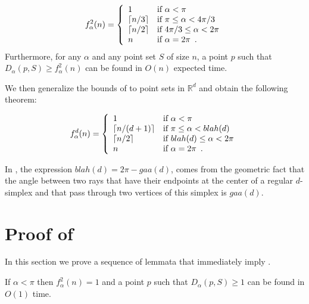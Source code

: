 \documentclass[lotsofwhite]{patmorin}
\begin{document}
\begin{thm}
\[
   f^2_\alpha(n) = \left\{\begin{array}{ll}
                        1 & \mbox{if $\alpha < \pi$} \\
                        \left\lceil n/3 \right\rceil & \mbox{if $\pi\le \alpha < 4\pi/3$} \\
                        \left\lceil n/2 \right\rceil & \mbox{if $4\pi/3\le \alpha < 2\pi$} \\
                        n & \mbox{if $\alpha = 2\pi$\enspace .} 
                       \end{array}\right.
\]
Furthermore, for any $\alpha$ and any point set $S$ of size $n$, a
point $p$ such that $D_\alpha(p,S) \ge
f^2_\alpha(n)$ can be found in $O(n)$ expected time.
\end{thm}

We then generalize the bounds of  to point sets in
$\mathbb{R}^d$ and obtain the following theorem:

\begin{thm}
\[
   f^d_\alpha(n) = \left\{\begin{array}{ll}
                        1 & \mbox{if $\alpha < \pi$} \\
                        \left\lceil n/(d+1) \right\rceil & \mbox{if $\pi\le \alpha < blah(d)$} \\
                        \left\lceil n/2 \right\rceil & \mbox{if $blah(d)\le \alpha < 2\pi$} \\
                        n & \mbox{if $\alpha = 2\pi$\enspace .} 
                       \end{array}\right.
\]
\end{thm}
In , the expression $blah(d)=2\pi-gaa(d)$, comes
from the geometric fact that the angle between
two rays that have their endpoints at the center of a regular
$d$-simplex and that pass through two vertices of this simplex is
$gaa(d)$. 


\section{Proof of }

In this section we prove a sequence of lemmata that immediately imply
.

\begin{lem}
If $\alpha < \pi$ then $f^2_\alpha(n) = 1$ and a point $p$ such that
$D_\alpha(p,S)\ge 1$ can be found in $O(1)$ time.
\end{lem}
\end{document}
